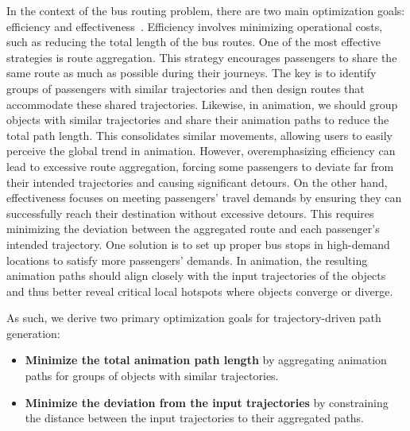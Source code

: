In the context of the bus routing problem, there are two main optimization goals: efficiency and effectiveness~\cite{li2002school}. 
Efficiency involves minimizing operational costs, such as reducing the total length of the bus routes. 
One of the most effective strategies is route aggregation.
This strategy encourages passengers to share the same route as much as possible during their journeys.
The key is to identify groups of passengers with similar trajectories and then design routes that accommodate these shared trajectories.
Likewise, in animation, we should group objects with similar trajectories and share their animation paths to reduce the total path length.
This consolidates similar movements, allowing users to easily perceive the global trend in animation.
However, overemphasizing efficiency can lead to excessive route aggregation, forcing some passengers to deviate far from their intended trajectories and causing significant detours. 
On the other hand, effectiveness focuses on meeting passengers' travel demands by ensuring they can successfully reach their destination without excessive detours.
This requires minimizing the deviation between the aggregated route and each passenger's intended trajectory.
One solution is to set up proper bus stops in high-demand locations to satisfy more passengers' demands.  
In animation, the resulting animation paths should align closely with the input trajectories of the objects and thus better reveal critical local hotspots where objects converge or diverge.

As such, we derive two primary optimization goals for trajectory-driven path generation: 
\begin{itemize}
[itemsep=2pt,topsep=0pt,parsep=0pt]

    \item \textbf{Minimize the total animation path length} by aggregating animation paths for groups of objects with similar trajectories. 
    \item \textbf{Minimize the deviation from the input trajectories} by constraining the distance between the input trajectories to their aggregated paths.  
\end{itemize}


